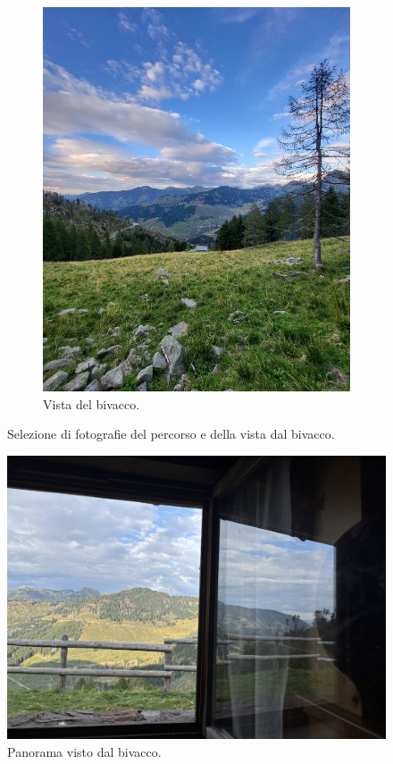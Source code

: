\documentclass{article}
\begin{document}
\begin{figure}[H]
\begin{subfigure}[b]{0.45\textwidth}
        \includegraphics[width=\textwidth]{images/foto_estiva.jpg}
        \caption{Vista del bivacco.}
    \end{subfigure}
    \hfill

    \caption{Selezione di fotografie del percorso e della vista dal bivacco.}
\end{figure}

\begin{figure}[htbp!]
    \centering
    \includegraphics[width=\textwidth]{images/foto_finestra.jpg}
    \caption{Panorama visto dal bivacco.}
    \label{fig:foto_orizzontale}
\end{figure}
\end{document}

